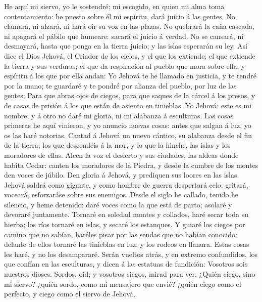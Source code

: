  He aquí mi siervo, yo le sostendré; mi escogido, en quien
mi alma toma contentamiento: he puesto sobre él mi espíritu, dará juicio
á las gentes.  No clamará, ni alzará, ni hará oir su voz
en las plazas.  No quebrará la caña cascada, ni apagará el
pábilo que humeare: sacará el juicio á verdad.  No se
cansará, ni desmayará, hasta que ponga en la tierra juicio; y las islas
esperarán su ley.  Así dice el Dios Jehová, el Criador de
los cielos, y el que los extiende; el que extiende la tierra y sus
verduras; el que da respiración al pueblo que mora sobre ella, y
espíritu á los que por ella andan:  Yo Jehová te he
llamado en justicia, y te tendré por la mano; te guardaré y te pondré
por alianza del pueblo, por luz de las gentes;  Para que
abras ojos de ciegos, para que saques de la cárcel á los presos, y de
casas de prisión á los que están de asiento en tinieblas. 
Yo Jehová: este es mi nombre; y á otro no daré mi gloria, ni mi alabanza
á esculturas.  Las cosas primeras he aquí vinieron, y yo
anuncio nuevas cosas: antes que salgan á luz, yo os las haré notorias.
 Cantad á Jehová un nuevo cántico, su alabanza desde el
fin de la tierra; los que descendéis á la mar, y lo que la hinche, las
islas y los moradores de ellas.  Alcen la voz el desierto
y sus ciudades, las aldeas donde habita Cedar: canten los moradores de
la Piedra, y desde la cumbre de los montes den voces de júbilo.
 Den gloria á Jehová, y prediquen sus loores en las
islas.  Jehová saldrá como gigante, y como hombre de
guerra despertará celo: gritará, voceará, esforzaráse sobre sus
enemigos.  Desde el siglo he callado, tenido he silencio,
y heme detenido: daré voces como la que está de parto; asolaré y
devoraré juntamente.  Tornaré en soledad montes y
collados, haré secar toda su hierba; los ríos tornaré en islas, y secaré
los estanques.  Y guiaré los ciegos por camino que no
sabían, haréles pisar por las sendas que no habían conocido; delante de
ellos tornaré las tinieblas en luz, y los rodeos en llanura. Estas cosas
les haré, y no los desampararé.  Serán vueltos atrás, y
en extremo confundidos, los que confían en las esculturas, y dicen á las
estatuas de fundición: Vosotros sois nuestros dioses. 
Sordos, oid; y vosotros ciegos, mirad para ver.  ¿Quién
ciego, sino mi siervo? ¿quién sordo, como mi mensajero que envié? ¿quién
ciego como el perfecto, y ciego como el siervo de Jehová,
